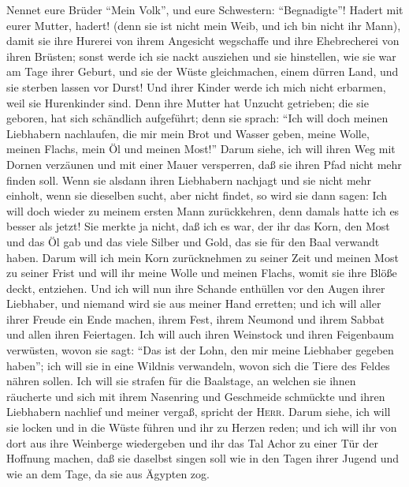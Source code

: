  Nennet eure Brüder ``Mein Volk'', und eure Schwestern:
``Begnadigte''!  Hadert mit eurer Mutter, hadert! (denn
sie ist nicht mein Weib, und ich bin nicht ihr Mann), damit sie ihre
Hurerei von ihrem Angesicht wegschaffe und ihre Ehebrecherei von ihren
Brüsten;  sonst werde ich sie nackt ausziehen und sie
hinstellen, wie sie war am Tage ihrer Geburt, und sie der Wüste
gleichmachen, einem dürren Land, und sie sterben lassen vor Durst!
 Und ihrer Kinder werde ich mich nicht erbarmen, weil sie
Hurenkinder sind.  Denn ihre Mutter hat Unzucht getrieben;
die sie geboren, hat sich schändlich aufgeführt; denn sie sprach: ``Ich
will doch meinen Liebhabern nachlaufen, die mir mein Brot und Wasser
geben, meine Wolle, meinen Flachs, mein Öl und meinen Most!''
 Darum siehe, ich will ihren Weg mit Dornen verzäunen und
mit einer Mauer versperren, daß sie ihren Pfad nicht mehr finden soll.
 Wenn sie alsdann ihren Liebhabern nachjagt und sie nicht
mehr einholt, wenn sie dieselben sucht, aber nicht findet, so wird sie
dann sagen: Ich will doch wieder zu meinem ersten Mann zurückkehren,
denn damals hatte ich es besser als jetzt!  Sie merkte ja
nicht, daß ich es war, der ihr das Korn, den Most und das Öl gab und das
viele Silber und Gold, das sie für den Baal verwandt haben.
 Darum will ich mein Korn zurücknehmen zu seiner Zeit und
meinen Most zu seiner Frist und will ihr meine Wolle und meinen Flachs,
womit sie ihre Blöße deckt, entziehen.  Und ich will nun
ihre Schande enthüllen vor den Augen ihrer Liebhaber, und niemand wird
sie aus meiner Hand erretten;  und ich will aller ihrer
Freude ein Ende machen, ihrem Fest, ihrem Neumond und ihrem Sabbat und
allen ihren Feiertagen.  Ich will auch ihren Weinstock
und ihren Feigenbaum verwüsten, wovon sie sagt: ``Das ist der Lohn, den
mir meine Liebhaber gegeben haben''; ich will sie in eine Wildnis
verwandeln, wovon sich die Tiere des Feldes nähren sollen.
 Ich will sie strafen für die Baalstage, an welchen sie
ihnen räucherte und sich mit ihrem Nasenring und Geschmeide schmückte
und ihren Liebhabern nachlief und meiner vergaß, spricht der
\textsc{Herr}.  Darum siehe, ich will sie locken und in
die Wüste führen und ihr zu Herzen reden;  und ich will
ihr von dort aus ihre Weinberge wiedergeben und ihr das Tal Achor zu
einer Tür der Hoffnung machen, daß sie daselbst singen soll wie in den
Tagen ihrer Jugend und wie an dem Tage, da sie aus Ägypten zog.

